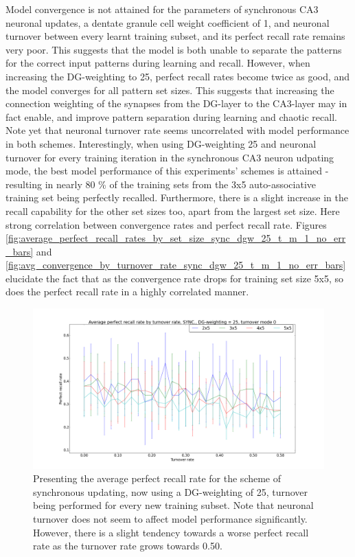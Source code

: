 Model convergence is not attained for the parameters of synchronous CA3 neuronal updates, a dentate granule cell weight coefficient of 1, and neuronal turnover between every learnt training subset, and its perfect recall rate remains very poor. This suggests that the model is both unable to separate the patterns for the correct input patterns during learning and recall. However, when increasing the DG-weighting to 25, perfect recall rates become twice as good, and the model converges for all pattern set sizes. This suggests that increasing the connection weighting of the synapses from the DG-layer to the CA3-layer may in fact enable, and improve pattern separation during learning and chaotic recall. Note yet that neuronal turnover rate seems uncorrelated with model performance in both schemes. Interestingly, when using DG-weighting 25 and neuronal turnover for every training iteration in the synchronous CA3 neuron udpating mode, the best model performance of this experiments' schemes is attained - resulting in  nearly 80 \% of the training sets from the 3x5 auto-associative training set being perfectly recalled. Furthermore, there is a slight increase in the recall capability for the other set sizes too, apart from the largest set size. Here strong correlation between convergence rates and perfect recall rate. Figures \ref{fig:average_perfect_recall_rates_by_set_size_sync_dgw_25_t_m_1_no_err_bars} and \ref{fig:avg_convergence_by_turnover_rate_sync_dgw_25_t_m_1_no_err_bars} elucidate the fact that as the convergence rate drops for training set size 5x5, so does the perfect recall rate in a highly correlated manner.

\begin{figure}
    \centering
    \includegraphics[width=14cm]{fig/average_perfect_recall_rates_by_set_size_sync_dgw_25_t_m_0_no_err_bars}
    \caption{Presenting the average perfect recall rate for the scheme of synchronous updating, now using a DG-weighting of 25, turnover being performed for every new training subset. Note that neuronal turnover does not seem to affect model performance significantly. However, there is a slight tendency towards a worse perfect recall rate as the turnover rate grows towards 0.50.}
    \label{fig:average_perfect_recall_rates_by_set_size_sync_dgw_25_t_m_0_no_err_bars}
\end{figure}

